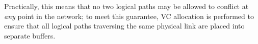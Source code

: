 %
Practically, this means that no two logical paths may be allowed to conflict at \emph{any} point in the network; to meet this guarantee, VC allocation is performed to ensure that all logical paths traversing the same physical link are placed into separate buffers.


